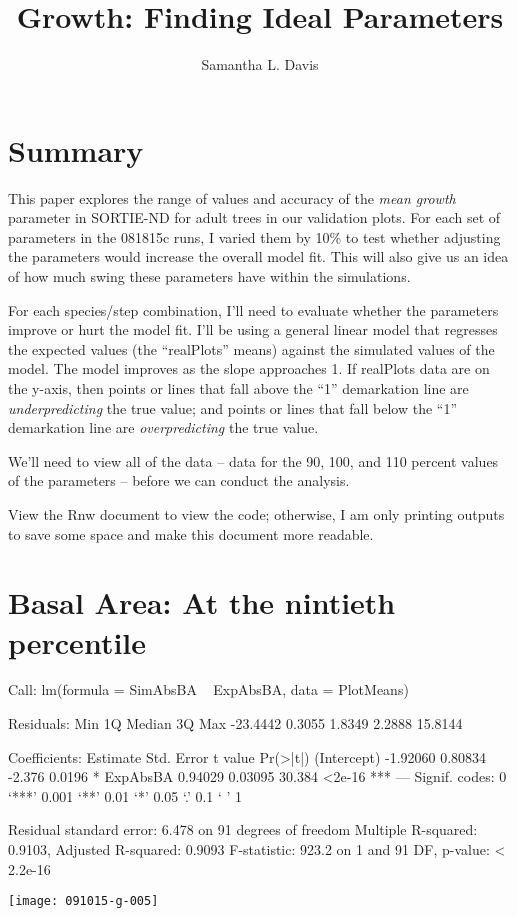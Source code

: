 \documentclass{article}
\begin{document}


\title{Growth: Finding Ideal Parameters}
\author{Samantha L. Davis}

\maketitle

\section{Summary}
This paper explores the range of values and accuracy of the \textit{mean growth} parameter in SORTIE-ND for adult trees in our validation plots. For each set of parameters in the 081815c runs, I varied them by 10\% to test whether adjusting the parameters would increase the overall model fit. This will also give us an idea of how much swing these parameters have within the simulations. 

For each species/step combination, I'll need to evaluate whether the parameters improve or hurt the model fit. I'll be using a general linear model that regresses the expected values (the ``realPlots'' means) against the simulated values of the model. The model improves as the slope approaches 1. If realPlots data are on the y-axis, then points or lines that fall above the ``1'' demarkation line are \textit{underpredicting} the true value; and points or lines that fall below the ``1'' demarkation line are \textit{overpredicting} the true value.

We'll need to view all of the data -- data for the 90, 100, and 110 percent values of the parameters -- before we can conduct the analysis. 

View the Rnw document to view the code; otherwise, I am only printing outputs to save some space and make this document more readable.







\newpage

\section{Basal Area: At the nintieth percentile}
\begin{Schunk}
\begin{Soutput}
Call:
lm(formula = SimAbsBA ~ ExpAbsBA, data = PlotMeans)

Residuals:
     Min       1Q   Median       3Q      Max 
-23.4442   0.3055   1.8349   2.2888  15.8144 

Coefficients:
            Estimate Std. Error t value Pr(>|t|)    
(Intercept) -1.92060    0.80834  -2.376   0.0196 *  
ExpAbsBA     0.94029    0.03095  30.384   <2e-16 ***
---
Signif. codes:  0 ‘***’ 0.001 ‘**’ 0.01 ‘*’ 0.05 ‘.’ 0.1 ‘ ’ 1

Residual standard error: 6.478 on 91 degrees of freedom
Multiple R-squared:  0.9103,	Adjusted R-squared:  0.9093 
F-statistic: 923.2 on 1 and 91 DF,  p-value: < 2.2e-16
\end{Soutput}
\end{Schunk}
\texttt{[image: 091015-g-005]}
\end{document}
